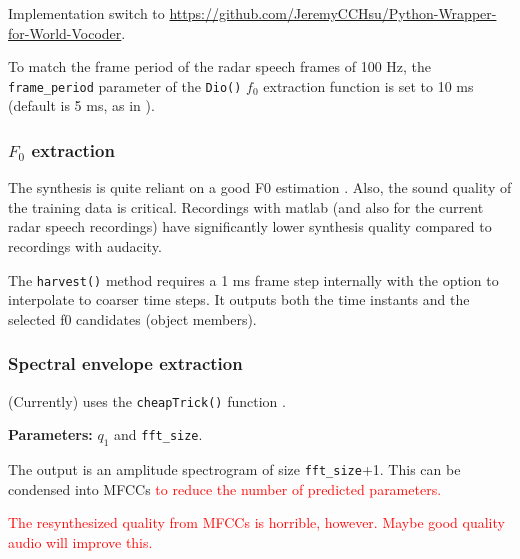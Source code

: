 \documentclass{article}
\begin{document}
Implementation switch to \url{https://github.com/JeremyCCHsu/Python-Wrapper-for-World-Vocoder}.

To match the frame period of the radar speech frames of 100 Hz, the \texttt{frame\_period} parameter of the \texttt{Dio()} $f_0$ extraction function is set to 10 ms (default is 5 ms, as in \cite{gonzalez2017direct}).

\subsubsection*{$F_0$ extraction}
The synthesis is quite reliant on a good F0 estimation \cite{morise2017harvest}. Also, the sound quality of the training data is critical. Recordings with matlab (and also for the current radar speech recordings) have significantly lower synthesis quality compared to recordings with audacity.

The \texttt{harvest()} method requires a 1 ms frame step internally with the option to interpolate to coarser time steps. It outputs both the time instants and the selected f0 candidates (object members).

\subsubsection*{Spectral envelope extraction}
(Currently) uses the \texttt{cheapTrick()} function \cite{masanoriCheapTrick_2015}. 

\textbf{Parameters:} $q_1$ and \texttt{fft\_size}.

The output is an amplitude spectrogram of size \texttt{fft\_size}+1. This can be condensed into MFCCs \textcolor{red}{to reduce the number of predicted parameters.}

\textcolor{red}{The resynthesized quality from MFCCs is horrible, however. Maybe good quality audio will improve this.}
\end{document}
